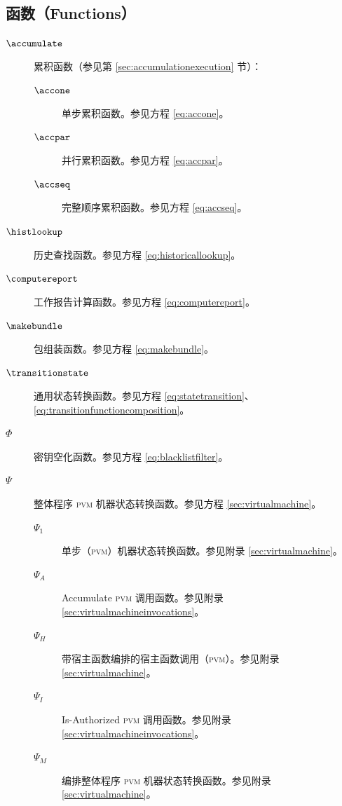 \subsection{函数（Functions）}

\begin{description}
  \item[$\accumulate$] 累积函数（参见第 \ref{sec:accumulationexecution} 节）：
  \begin{description}
    \item[$\accone$] 单步累积函数。参见方程 \ref{eq:accone}。
    \item[$\accpar$] 并行累积函数。参见方程 \ref{eq:accpar}。
    \item[$\accseq$] 完整顺序累积函数。参见方程 \ref{eq:accseq}。
  \end{description}
  \item[$\histlookup$] 历史查找函数。参见方程 \ref{eq:historicallookup}。
  \item[$\computereport$] 工作报告计算函数。参见方程 \ref{eq:computereport}。
  \item[$\makebundle$] 包组装函数。参见方程 \ref{eq:makebundle}。
  \item[$\transitionstate$] 通用状态转换函数。参见方程 \ref{eq:statetransition}、\ref{eq:transitionfunctioncomposition}。
  \item[$\Phi$] 密钥空化函数。参见方程 \ref{eq:blacklistfilter}。
  \item[$\Psi$] 整体程序 \textsc{pvm} 机器状态转换函数。参见方程 \ref{sec:virtualmachine}。
  \begin{description}
    \item[$\Psi_1$] 单步（\textsc{pvm}）机器状态转换函数。参见附录 \ref{sec:virtualmachine}。
    \item[$\Psi_A$] Accumulate \textsc{pvm} 调用函数。参见附录 \ref{sec:virtualmachineinvocations}。
    \item[$\Psi_H$] 带宿主函数编排的宿主函数调用（\textsc{pvm}）。参见附录 \ref{sec:virtualmachine}。
    \item[$\Psi_I$] Is-Authorized \textsc{pvm} 调用函数。参见附录 \ref{sec:virtualmachineinvocations}。
    \item[$\Psi_M$] 编排整体程序 \textsc{pvm} 机器状态转换函数。参见附录 \ref{sec:virtualmachine}。

\end{description}
\end{description}
